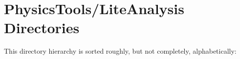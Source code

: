\section{Physics\-Tools/Lite\-Analysis Directories}
This directory hierarchy is sorted roughly, but not completely, alphabetically:\begin{CompactList}
\item {}
\end{CompactList}

